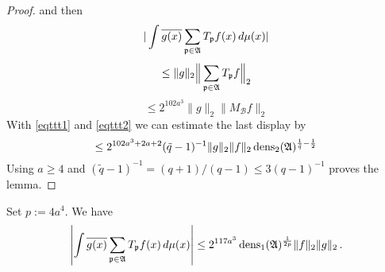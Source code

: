 \begin{proof}
and then 
 \begin{equation}
     |\int \overline{g(x)} \sum_{{\mathfrak p} \in \mathfrak{A}} T_{{\mathfrak p}} f(x)\, d\mu(x)|
\end{equation}
 \begin{equation}
     \le \|g\|_2 \Big\| \sum_{{\mathfrak p} \in \mathfrak{A}} T_{{\mathfrak p}} f \Big\|_2
\end{equation}
 \begin{equation}
     \le 2^{102a^3}\|g\|_2 \| M_{\mathcal{B}}f \|_2
\end{equation}
With \eqref{eqttt1} and
\eqref{eqttt2} we can estimate the last display by
\begin{equation}
    \le 2^{102a^3+2a+2}(\tilde{q}-1)^{-1} \|g\|_2 \|f\|_2\operatorname{\operatorname{dens}}_2(\mathfrak{A})^{\frac 1{\tilde{q}}-\frac 12}
\end{equation}
Using $a\ge 4$ and
$(\tilde q - 1)^{-1} = (q+1)/(q-1) \le 3(q-1)^{-1}$
proves the lemma.
\end{proof}


\begin{lemma}\label{dens1-antichain}
    \leanok
Set $p:=4a^4$. We have
    \begin{equation}\label{eqttt3}
  \left|\int \overline{g(x)} \sum_{{\mathfrak p} \in \mathfrak{A}} T_{{\mathfrak p}} f(x)\, d\mu(x)\right|\le
   2^{117a^3}\operatorname{\operatorname{dens}}_1(\mathfrak{A})^{\frac 1{2p}} \|f\|_2\|g\|_2\,.
\end{equation}
\end{lemma}

